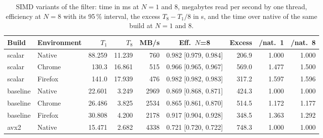 \begin{table}[htbp]
\caption{SIMD variants of the filter: time in ms at $N=1$ and 8, megabytes read per second by one thread, efficiency at $N=8$ with its 95\,\% interval, the excess $T_8-T_1/8$ in \textmu s, and the time over native of the same build at $N=1$ and 8.}\label{tab:simd}
\centering\footnotesize
\begin{tabular}{llrrrcrrr}
\toprule
Build & Environment & $T_1$ & $T_8$ & MB/s & Eff.\ $N$=8 & Excess & /nat.\ 1 & /nat.\ 8 \\
\midrule
scalar & Native & 88.259 & 11.239 & 760 & 0.982 [0.979, 0.984] & 206.9 & 1.000 & 1.000 \\
scalar & Chrome & 130.3 & 16.861 & 515 & 0.966 [0.965, 0.967] & 569.0 & 1.477 & 1.500 \\
scalar & Firefox & 141.0 & 17.939 & 476 & 0.982 [0.982, 0.983] & 317.2 & 1.597 & 1.596 \\
baseline & Native & 22.601 & 3.249 & 2969 & 0.869 [0.868, 0.871] & 424.3 & 1.000 & 1.000 \\
baseline & Chrome & 26.486 & 3.825 & 2534 & 0.865 [0.861, 0.870] & 514.5 & 1.172 & 1.177 \\
baseline & Firefox & 30.808 & 4.200 & 2178 & 0.917 [0.904, 0.928] & 348.5 & 1.363 & 1.292 \\
avx2 & Native & 15.471 & 2.682 & 4338 & 0.721 [0.720, 0.722] & 748.3 & 1.000 & 1.000 \\
\bottomrule
\end{tabular}
\end{table}
